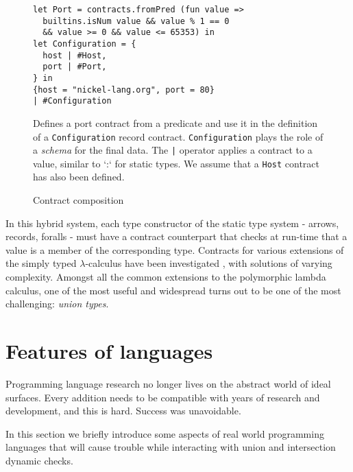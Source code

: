 \documentclass[sigplan,10pt,review,anonymous]{acmart}
\newcommand{\info}[2][1=]{}
\begin{document}
\begin{figure}
  \begin{center}
\begin{lstlisting}[language=nickel]
let Port = contracts.fromPred (fun value =>
  builtins.isNum value && value % 1 == 0
  && value >= 0 && value <= 65353) in
let Configuration = {
  host | #Host,
  port | #Port,
} in
{host = "nickel-lang.org", port = 80}
| #Configuration
\end{lstlisting}
  \end{center}
\caption{Contract composition}
\label{fig:contract-composition}
\medskip
\small
Defines a port contract from a predicate and use it in the definition of a
\lstinline+Configuration+ record contract. \lstinline+Configuration+ plays the
role of a \emph{schema} for the final data. The \lstinline+|+ operator applies a
contract to a value, similar to `:` for static types. We assume that a
\lstinline+Host+ contract has also been defined.
\end{figure}

In this hybrid system, each type constructor of the static type system - arrows,
records, foralls - must have a contract counterpart that checks at run-time that
a value is a member of the corresponding type. Contracts for various
extensions of the simply typed $\lambda$-calculus have been investigated
\cite{BlameForAll, KeilThiemannUnionIntersection, RootCauseOfBlame,
DependentContracts, GradualTypingClasses}, with solutions of varying complexity.
Amongst all the common extensions to the polymorphic lambda calculus, one of the
most useful and widespread turns out to be one of the most challenging:
\emph{union types}.

\newpage

\section{Features of languages}
\info{Zoology of various features that we will eventually show
  conflict with this or that property or implementation of union and
  intersection. Including user-define contracts.}

Programming language research no longer lives on the abstract world
of ideal surfaces.
Every addition needs to be compatible with years of research
and development, and this is hard.
Success was unavoidable.

In this section we briefly introduce some aspects of real world
programming languages that will cause trouble while interacting
with union and intersection dynamic checks.
\end{document}
